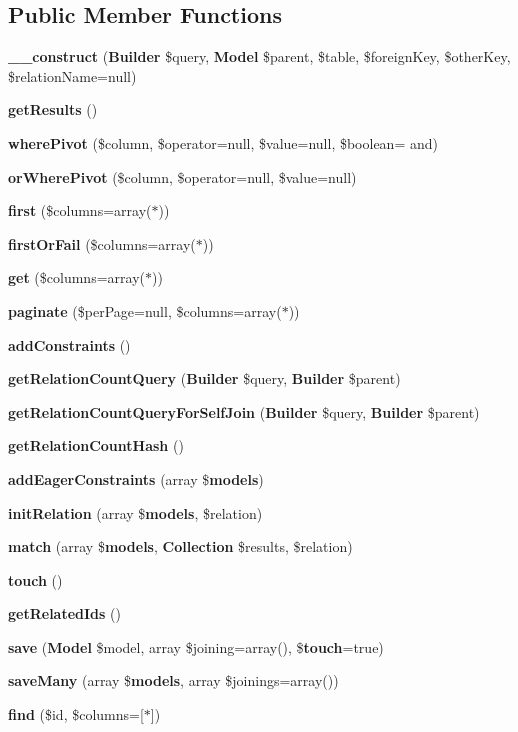 \subsection*{Public Member Functions}
\begin{DoxyCompactItemize}
\item 
{\bf \+\_\+\+\_\+construct} ({\bf Builder} \$query, {\bf Model} \$parent, \$table, \$foreign\+Key, \$other\+Key, \$relation\+Name=null)
\item 
{\bf get\+Results} ()
\item 
{\bf where\+Pivot} (\$column, \$operator=null, \$value=null, \$boolean= \textquotesingle{}and\textquotesingle{})
\item 
{\bf or\+Where\+Pivot} (\$column, \$operator=null, \$value=null)
\item 
{\bf first} (\$columns=array(\textquotesingle{}$\ast$\textquotesingle{}))
\item 
{\bf first\+Or\+Fail} (\$columns=array(\textquotesingle{}$\ast$\textquotesingle{}))
\item 
{\bf get} (\$columns=array(\textquotesingle{}$\ast$\textquotesingle{}))
\item 
{\bf paginate} (\$per\+Page=null, \$columns=array(\textquotesingle{}$\ast$\textquotesingle{}))
\item 
{\bf add\+Constraints} ()
\item 
{\bf get\+Relation\+Count\+Query} ({\bf Builder} \$query, {\bf Builder} \$parent)
\item 
{\bf get\+Relation\+Count\+Query\+For\+Self\+Join} ({\bf Builder} \$query, {\bf Builder} \$parent)
\item 
{\bf get\+Relation\+Count\+Hash} ()
\item 
{\bf add\+Eager\+Constraints} (array \${\bf models})
\item 
{\bf init\+Relation} (array \${\bf models}, \$relation)
\item 
{\bf match} (array \${\bf models}, {\bf Collection} \$results, \$relation)
\item 
{\bf touch} ()
\item 
{\bf get\+Related\+Ids} ()
\item 
{\bf save} ({\bf Model} \$model, array \$joining=array(), \${\bf touch}=true)
\item 
{\bf save\+Many} (array \${\bf models}, array \$joinings=array())
\item 
{\bf find} (\$id, \$columns=[\textquotesingle{}$\ast$\textquotesingle{}])
\item 

\end{DoxyCompactItemize}
